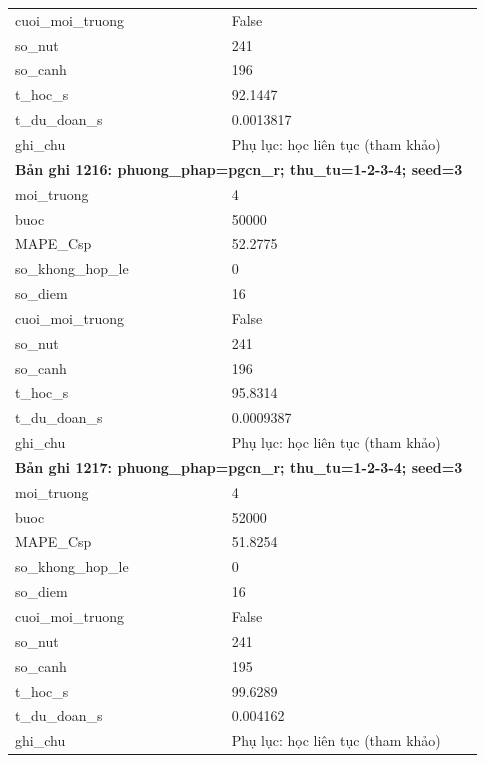 \begin{longtable}{p{0.43\linewidth}p{0.50\linewidth}}
cuoi\_\allowbreak moi\_\allowbreak truong & False \\
so\_\allowbreak nut & 241 \\
so\_\allowbreak canh & 196 \\
t\_\allowbreak hoc\_\allowbreak s & 92.1447 \\
t\_\allowbreak du\_\allowbreak doan\_\allowbreak s & 0.0013817 \\
ghi\_\allowbreak chu & Phụ lục: học liên tục (tham khảo) \\
\midrule
\multicolumn{2}{p{0.95\linewidth}}{\textbf{Bản ghi 1216: phuong\_phap=pgcn\_r; thu\_tu=1-2-3-4; seed=3}} \\
moi\_\allowbreak truong & 4 \\
buoc & 50000 \\
MAPE\_\allowbreak Csp & 52.2775 \\
so\_\allowbreak khong\_\allowbreak hop\_\allowbreak le & 0 \\
so\_\allowbreak diem & 16 \\
cuoi\_\allowbreak moi\_\allowbreak truong & False \\
so\_\allowbreak nut & 241 \\
so\_\allowbreak canh & 196 \\
t\_\allowbreak hoc\_\allowbreak s & 95.8314 \\
t\_\allowbreak du\_\allowbreak doan\_\allowbreak s & 0.0009387 \\
ghi\_\allowbreak chu & Phụ lục: học liên tục (tham khảo) \\
\midrule
\multicolumn{2}{p{0.95\linewidth}}{\textbf{Bản ghi 1217: phuong\_phap=pgcn\_r; thu\_tu=1-2-3-4; seed=3}} \\
moi\_\allowbreak truong & 4 \\
buoc & 52000 \\
MAPE\_\allowbreak Csp & 51.8254 \\
so\_\allowbreak khong\_\allowbreak hop\_\allowbreak le & 0 \\
so\_\allowbreak diem & 16 \\
cuoi\_\allowbreak moi\_\allowbreak truong & False \\
so\_\allowbreak nut & 241 \\
so\_\allowbreak canh & 195 \\
t\_\allowbreak hoc\_\allowbreak s & 99.6289 \\
t\_\allowbreak du\_\allowbreak doan\_\allowbreak s & 0.004162 \\
ghi\_\allowbreak chu & Phụ lục: học liên tục (tham khảo) \\

\end{longtable}
